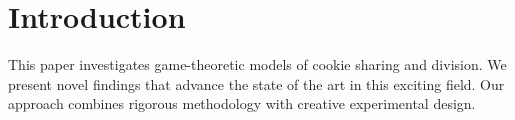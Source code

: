 \section{Introduction}

This paper investigates game-theoretic models of cookie sharing and division. We present novel findings that advance the state of the art in this exciting field. Our approach combines rigorous methodology with creative experimental design.
